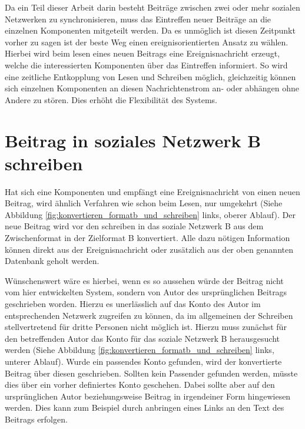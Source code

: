 \medskip

Da ein Teil dieser Arbeit darin besteht Beiträge zwischen zwei oder mehr sozialen Netzwerken zu synchronisieren, muss das Eintreffen neuer Beiträge an die einzelnen Komponenten mitgeteilt werden. Da es unmöglich ist diesen Zeitpunkt vorher zu sagen ist der beste Weg einen ereignisorientierten Ansatz zu wählen. Hierbei wird beim lesen eines neuen Beitrags eine Ereignisnachricht erzeugt, welche die interessierten Komponenten über das Eintreffen informiert. So wird eine zeitliche Entkopplung von Lesen und Schreiben möglich, gleichzeitig können sich einzelnen Komponenten an diesen Nachrichtenstrom an- oder abhängen ohne Andere zu stören. Dies erhöht die Flexibilität des Systems.


\section{Beitrag in soziales Netzwerk B schreiben} %
\label{sec:beitrag_in_soziales_netzwerk_b_schreiben}

Hat sich eine Komponenten und empfängt eine Ereignisnachricht von einen neuen Beitrag, wird ähnlich Verfahren wie schon beim Lesen, nur umgekehrt (Siehe Abbildung \ref{fig:konvertieren_formatb_und_schreiben} links, oberer Ablauf). Der neue Beitrag wird vor den schreiben in das soziale Netzwerk B aus dem Zwischenformat in der Zielformat B konvertiert. Alle dazu nötigen Information können direkt aus der Ereignisnachricht oder zusätzlich aus der oben genannten Datenbank geholt werden. 

\medskip

Wünschenswert wäre es hierbei, wenn es so aussehen würde der Beitrag nicht vom hier entwickelten System, sondern von Autor des ursprünglichen Beitrags geschrieben worden. Hierzu es unerlässlich auf das Konto des Autor im entsprechenden Netzwerk zugreifen zu können, da im allgemeinen der Schreiben stellvertretend für dritte Personen nicht möglich ist. Hierzu muss zunächst für den betreffenden Autor das Konto für das soziale Netzwerk B herausgesucht werden (Siehe Abbildung \ref{fig:konvertieren_formatb_und_schreiben} links, unterer Ablauf). Wurde ein passendes Konto gefunden, wird der konvertierte Beitrag über diesen geschrieben. Sollten kein Passender gefunden werden, müsste dies über ein vorher definiertes Konto geschehen. Dabei sollte aber auf den ursprünglichen Autor beziehungsweise Beitrag in irgendeiner Form hingewiesen werden. Dies kann zum Beispiel durch anbringen eines Links an den  Text des Beitrags erfolgen. 

